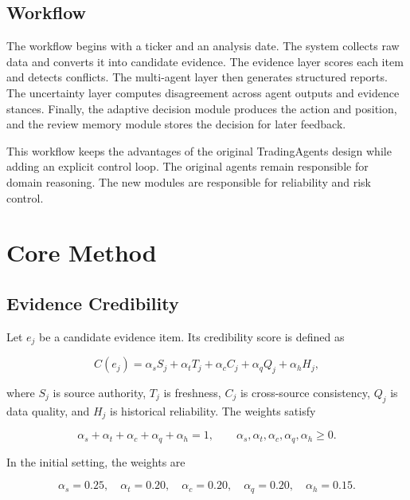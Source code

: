 \documentclass[14pt,a4paper]{extarticle}
\begin{document}
\subsection{Workflow}

The workflow begins with a ticker and an analysis date. The system collects raw data and converts it into candidate evidence. The evidence layer scores each item and detects conflicts. The multi-agent layer then generates structured reports. The uncertainty layer computes disagreement across agent outputs and evidence stances. Finally, the adaptive decision module produces the action and position, and the review memory module stores the decision for later feedback.

This workflow keeps the advantages of the original TradingAgents design while adding an explicit control loop. The original agents remain responsible for domain reasoning. The new modules are responsible for reliability and risk control.

\section{Core Method}

\subsection{Evidence Credibility}

Let $e_j$ be a candidate evidence item. Its credibility score is defined as

\begin{equation}
C(e_j)=
\alpha_s S_j+\alpha_t T_j+\alpha_c C_j+\alpha_q Q_j+\alpha_h H_j ,
\label{eq:credibility}
\end{equation}

where $S_j$ is source authority, $T_j$ is freshness, $C_j$ is cross-source consistency, $Q_j$ is data quality, and $H_j$ is historical reliability. The weights satisfy

\begin{equation}
\alpha_s+\alpha_t+\alpha_c+\alpha_q+\alpha_h=1,
\qquad
\alpha_s,\alpha_t,\alpha_c,\alpha_q,\alpha_h \geq 0.
\label{eq:credibility-weights}
\end{equation}

In the initial setting, the weights are

\begin{equation}
\alpha_s=0.25,\quad
\alpha_t=0.20,\quad
\alpha_c=0.20,\quad
\alpha_q=0.20,\quad
\alpha_h=0.15.
\label{eq:initial-weights}
\end{equation}
\end{document}
